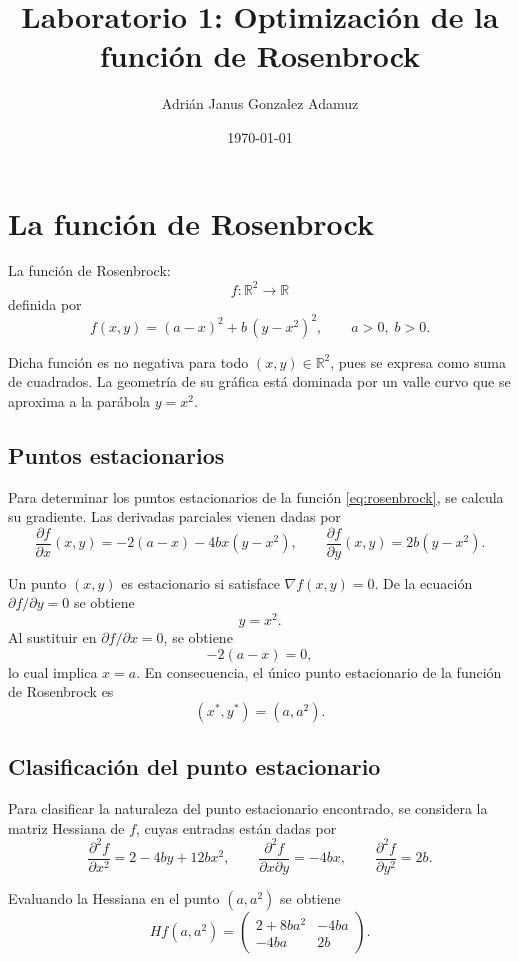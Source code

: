 \documentclass[11pt,a4paper]{article}
\title{Laboratorio 1: Optimización de la función de Rosenbrock}
\author{Adrián Janus Gonzalez Adamuz}
\date{\today}
\begin{document}
\maketitle

\section{La función de Rosenbrock}

La función de Rosenbrock: 
\[
f:\mathbb{R}^2 \to \mathbb{R}
\]
definida por
\begin{equation}
f(x,y) = (a - x)^2 + b\,(y - x^2)^2,
\qquad a>0,\; b>0.
\label{eq:rosenbrock}
\end{equation}

Dicha función es no negativa para todo $(x,y)\in\mathbb{R}^2$, pues se expresa como suma de cuadrados. La geometría de su gráfica está dominada por un valle curvo que se aproxima a la parábola $y=x^2$. 

\subsection{Puntos estacionarios}

Para determinar los puntos estacionarios de la función \eqref{eq:rosenbrock}, se calcula su gradiente. Las derivadas parciales vienen dadas por
\[
\frac{\partial f}{\partial x}(x,y) = -2(a-x) - 4bx(y-x^2),
\qquad
\frac{\partial f}{\partial y}(x,y) = 2b(y-x^2).
\]

Un punto $(x,y)$ es estacionario si satisface $\nabla f(x,y)=0$. De la ecuación $\partial f/\partial y=0$ se obtiene 
\[
y = x^2.
\]
Al sustituir en $\partial f/\partial x=0$, se obtiene
\[
-2(a-x)=0,
\]
lo cual implica $x=a$. En consecuencia, el único punto estacionario de la función de Rosenbrock es
\[
(x^\ast,y^\ast) = (a,a^2).
\]

\subsection{Clasificación del punto estacionario}

Para clasificar la naturaleza del punto estacionario encontrado, se considera la matriz Hessiana de $f$, cuyas entradas están dadas por
\[
\frac{\partial^2 f}{\partial x^2} = 2 - 4by + 12bx^2,
\qquad
\frac{\partial^2 f}{\partial x \partial y} = -4bx,
\qquad
\frac{\partial^2 f}{\partial y^2} = 2b.
\]

Evaluando la Hessiana en el punto $(a,a^2)$ se obtiene
\[
Hf(a,a^2) =
\begin{pmatrix}
2 + 8ba^2 & -4ba \\
-4ba & 2b
\end{pmatrix}.
\]
\end{document}

